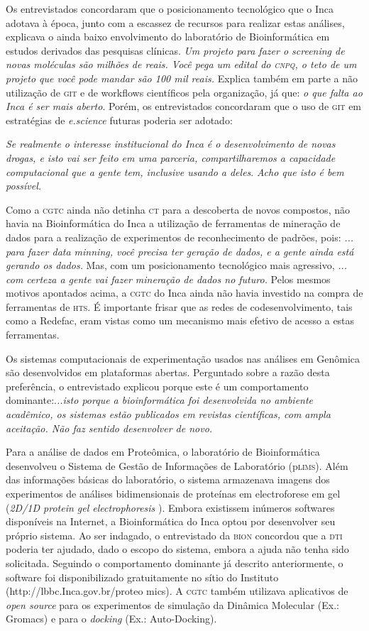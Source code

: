 \documentclass{article}
\begin{document}
Os entrevistados concordaram que o posicionamento tecnológico que o Inca adotava
à época, junto com a escassez de recursos para realizar estas análises,
explicava o ainda baixo envolvimento do laboratório de Bioinformática em estudos
derivados das pesquisas clínicas. \textit{Um projeto para fazer o screening de
novas moléculas são milhões de reais. Você pega um edital do \textsc{cnpq}, o teto de um
projeto que você pode mandar são 100 mil reais.}
Explica também em parte a não utilização de \textsc{git} e de workflows científicos pela
organização, já que: \textit{o que falta ao Inca é ser mais aberto}. Porém, os entrevistados concordaram que o uso de \textsc{git} em estratégias de
\textit{e.science}
futuras poderia ser adotado:

\textit{Se realmente o interesse institucional do Inca é o desenvolvimento de
novas drogas, e isto vai ser feito em uma parceria, compartilharemos a
capacidade computacional que a gente tem, inclusive usando a deles}. \textit{Acho que isto é bem possível.}

Como a \textsc{cgtc} ainda não detinha \textsc{ct} para a descoberta de novos compostos, não havia
na Bioinformática do Inca a utilização de ferramentas de mineração de dados para
a realização de experimentos de reconhecimento de padrões, pois: \textit{...
para fazer data minning, você precisa ter geração de dados, e a gente ainda está
gerando os dados.}
Mas, com um posicionamento tecnológico mais agressivo, \textit{... com certeza a
gente vai fazer mineração de dados no futuro.}
Pelos mesmos motivos apontados acima, a \textsc{cgtc} do Inca ainda não havia investido
na compra de ferramentas de \textsc{hts}. É importante frisar que as redes de
codesenvolvimento, tais como a Redefac, eram vistas como um mecanismo mais
efetivo de acesso a estas ferramentas.

Os sistemas computacionais de experimentação usados nas análises em Genômica são
desenvolvidos em plataformas abertas. Perguntado sobre a razão desta
preferência, o entrevistado explicou porque este é um comportamento dominante:.\textit{..isto porque a bioinformática foi desenvolvida no ambiente acadêmico,
os sistemas estão publicados em revistas científicas, com ampla aceitação. Não
faz sentido desenvolver de novo.}

Para a análise de dados em Proteômica, o laboratório de Bioinformática
desenvolveu o Sistema de Gestão de Informações de Laboratório (p\textsc{lims}). Além das
informações básicas do laboratório, o sistema armazenava imagens dos
experimentos de análises bidimensionais de proteínas em electroforese em gel
(\textit{2D/1D protein gel electrophoresis}
). Embora existissem inúmeros softwares disponíveis na Internet, a
Bioinformática do Inca optou por desenvolver seu próprio sistema. Ao ser
indagado, o entrevistado da \textsc{bion} concordou que a \textsc{dti} poderia ter ajudado, dado o
escopo do sistema, embora a ajuda não tenha sido solicitada. Seguindo o
comportamento dominante já descrito anteriormente, o software foi
disponibilizado gratuitamente no sítio do Instituto
(http://lbbc.Inca.gov.br/proteo mics). A \textsc{cgtc} também utilizava aplicativos de
\textit{open source}
para os experimentos de simulação da Dinâmica Molecular (Ex.: Gromacs) e para o
\textit{docking}
(Ex.: Auto-Docking).
\end{document}
